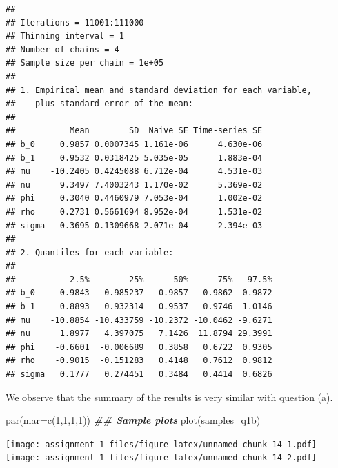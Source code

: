 \documentclass[
]{article}
\newenvironment{Shaded}{\begin{snugshade}}{\end{snugshade}}
\newcommand{\AttributeTok}[1]{\textcolor[rgb]{0.77,0.63,0.00}{#1}}
\newcommand{\DecValTok}[1]{\textcolor[rgb]{0.00,0.00,0.81}{#1}}
\newcommand{\DocumentationTok}[1]{\textcolor[rgb]{0.56,0.35,0.01}{\textbf{\textit{#1}}}}
\newcommand{\FunctionTok}[1]{\textcolor[rgb]{0.00,0.00,0.00}{#1}}
\newcommand{\NormalTok}[1]{#1}
\begin{document}
\begin{verbatim}
## 
## Iterations = 11001:111000
## Thinning interval = 1 
## Number of chains = 4 
## Sample size per chain = 1e+05 
## 
## 1. Empirical mean and standard deviation for each variable,
##    plus standard error of the mean:
## 
##           Mean        SD  Naive SE Time-series SE
## b_0     0.9857 0.0007345 1.161e-06      4.630e-06
## b_1     0.9532 0.0318425 5.035e-05      1.883e-04
## mu    -10.2405 0.4245088 6.712e-04      4.531e-03
## nu      9.3497 7.4003243 1.170e-02      5.369e-02
## phi     0.3040 0.4460979 7.053e-04      1.002e-02
## rho     0.2731 0.5661694 8.952e-04      1.531e-02
## sigma   0.3695 0.1309668 2.071e-04      2.394e-03
## 
## 2. Quantiles for each variable:
## 
##           2.5%        25%      50%      75%   97.5%
## b_0     0.9843   0.985237   0.9857   0.9862  0.9872
## b_1     0.8893   0.932314   0.9537   0.9746  1.0146
## mu    -10.8854 -10.433759 -10.2372 -10.0462 -9.6271
## nu      1.8977   4.397075   7.1426  11.8794 29.3991
## phi    -0.6601  -0.006689   0.3858   0.6722  0.9305
## rho    -0.9015  -0.151283   0.4148   0.7612  0.9812
## sigma   0.1777   0.274451   0.3484   0.4414  0.6826
\end{verbatim}

We observe that the summary of the results is very similar with question
(a).

\begin{Shaded}
\begin{Highlighting}[]
\FunctionTok{par}\NormalTok{(}\AttributeTok{mar=}\FunctionTok{c}\NormalTok{(}\DecValTok{1}\NormalTok{,}\DecValTok{1}\NormalTok{,}\DecValTok{1}\NormalTok{,}\DecValTok{1}\NormalTok{))}
\DocumentationTok{\#\# Sample plots}
\FunctionTok{plot}\NormalTok{(samples\_q1b)}
\end{Highlighting}
\end{Shaded}

\texttt{[image: assignment-1\_files/figure-latex/unnamed-chunk-14-1.pdf]}
\texttt{[image: assignment-1\_files/figure-latex/unnamed-chunk-14-2.pdf]}
\end{document}
